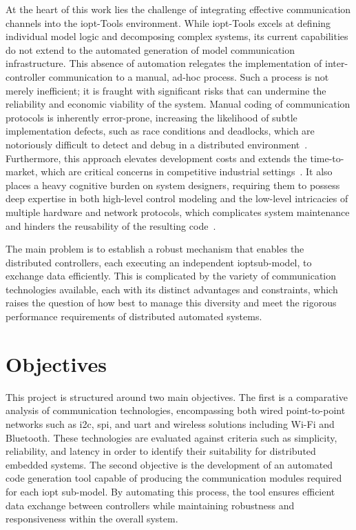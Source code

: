 At the heart of this work lies the challenge of integrating effective communication channels into the \gls{iopt}-Tools environment. While \gls{iopt}-Tools excels at defining individual model logic and decomposing complex systems, its current capabilities do not extend to the automated generation of model communication infrastructure. 
This absence of automation relegates the implementation of inter-controller communication to a manual, ad-hoc process. Such a process is not merely inefficient; it is fraught with significant risks that can undermine the reliability and economic viability of the system. Manual coding of communication protocols is inherently error-prone, increasing the likelihood of subtle implementation defects, such as race conditions and deadlocks, which are notoriously difficult to detect and debug in a distributed environment~\cite{Broy2012}. Furthermore, this approach elevates development costs and extends the time-to-market, which are critical concerns in competitive industrial settings~\cite{Stahl2006}. It also places a heavy cognitive burden on system designers, requiring them to possess deep expertise in both high-level control modeling and the low-level intricacies of multiple hardware and network protocols, which complicates system maintenance and hinders the reusability of the resulting code~\cite{Sommerville2011}.

The main problem is to establish a robust mechanism that enables the distributed controllers, each executing an independent \gls{iopt}sub-model, to exchange data efficiently. This is complicated by the variety of communication technologies available, each with its distinct advantages and constraints, which raises the question of how best to manage this diversity and meet the rigorous performance requirements of distributed automated systems.

\section{Objectives}
\label{sec:objectives}

This project is structured around two main objectives. The first is a comparative analysis of communication technologies, encompassing both wired point-to-point networks such as \gls{i2c}, \gls{spi}, and \gls{uart} and wireless solutions including Wi-Fi and Bluetooth. These technologies are evaluated against criteria such as simplicity, reliability, and latency in order to identify their suitability for distributed embedded systems. The second objective is the development of an automated code generation tool capable of producing the communication modules required for each \gls{iopt} sub-model. By automating this process, the tool ensures efficient data exchange between controllers while maintaining robustness and responsiveness within the overall system.

